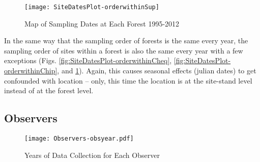 \begin{figure}
\texttt{[image: SiteDatesPlot-orderwithinSup]}
\caption{Map of Sampling Dates at Each Forest 1995-2012}
\label{fig:SiteDatesPlot-orderwithinSup}
\end{figure}

In the same way that the sampling order of forests is the same every year, the sampling order of sites within a forest is also the same every year with a few exceptions (Figs. \ref{fig:SiteDatesPlot-orderwithinCheq}, \ref{fig:SiteDatesPlot-orderwithinChip}, and \ref{fig:SiteDatesPlot-orderwithinSup}).  Again, this causes seasonal effects (julian dates) to get confounded with location -- only, this time the location is at the site-stand level instead of at the forest level.



\subsection{Observers}

\begin{figure}
\texttt{[image: Observers-obsyear.pdf]}
\caption{Years of Data Collection for Each Observer}
\label{fig:Observers-obsyear}
\end{figure}


